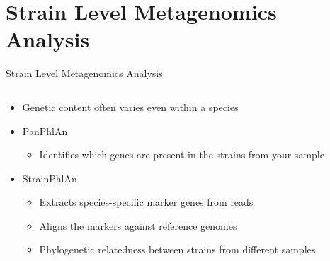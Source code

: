 \documentclass{beamer}
\begin{document}
\section{Strain Level Metagenomics Analysis}
\begin{frame}{Strain Level Metagenomics Analysis}
	\vspace{-0.85cm}
	\begin{columns}
		\begin{column}[t]{.44\textwidth}
			\begin{itemize}
				\item Genetic content often varies even within a species
				\item PanPhlAn
				      \begin{itemize}
					      \item Identifies which genes are present in the strains from your sample
				      \end{itemize}
				\item StrainPhlAn
				      \begin{itemize}
					      \item Extracts species-specific marker genes from reads
					      \item Aligns the markers against reference genomes
					      \item Phylogenetic relatedness between strains from different samples
				      \end{itemize}
			\end{itemize}
		\end{column}


\end{columns}
\end{frame}
\end{document}
